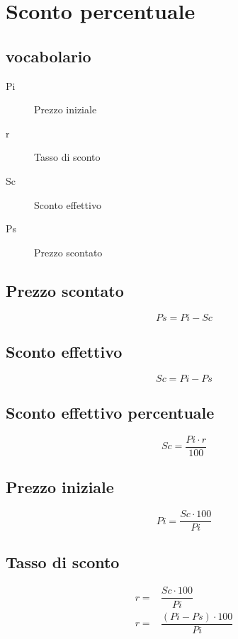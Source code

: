 
\chapter{Sconto percentuale}
\section{vocabolario}
\begin{description}
	\item[Pi] Prezzo iniziale
	\item[r] Tasso di sconto
	\item[Sc] Sconto effettivo
	\item[Ps] Prezzo scontato
\end{description}\section{Prezzo scontato}
\begin{equation}
Ps=Pi-Sc
\end{equation}
\section{Sconto effettivo}
\begin{equation}
Sc=Pi-Ps
\end{equation}

\section{Sconto effettivo percentuale}
\begin{equation}
Sc=\dfrac{Pi\cdot r}{100}
\end{equation}
\section{Prezzo iniziale}
\begin{equation}
Pi=\dfrac{Sc\cdot 100}{Pi}
\end{equation}

\section{Tasso di sconto}
\begin{align}
r=&\dfrac{Sc\cdot 100}{Pi}\\
r=&\dfrac{(Pi-Ps)\cdot 100}{Pi}
\end{align}